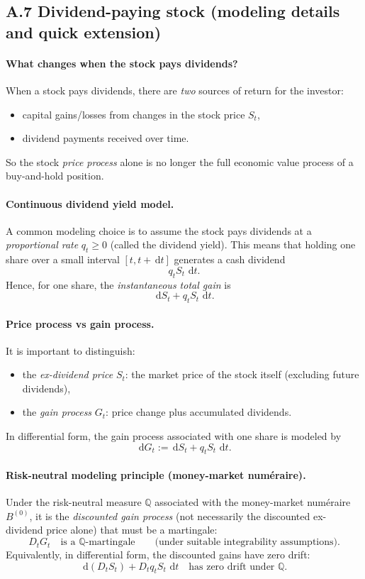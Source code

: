 \documentclass[11pt]{article}
\newcommand{\Qbb}{\mathbb{Q}}
\newcommand{\dd}{\,\mathrm{d}}
\newcommand{\1}{\mathbf{1}}
\begin{document}
\subsection*{A.7 Dividend-paying stock (modeling details and quick extension)}

\paragraph{What changes when the stock pays dividends?}
When a stock pays dividends, there are \emph{two} sources of return for the investor:
\begin{itemize}[leftmargin=1.4em]
    \item capital gains/losses from changes in the stock price \(S_t\),
    \item dividend payments received over time.
\end{itemize}
So the stock \emph{price process} alone is no longer the full economic value process of a buy-and-hold position.

\paragraph{Continuous dividend yield model.}
A common modeling choice is to assume the stock pays dividends at a \emph{proportional rate} \(q_t\ge 0\) (called the dividend yield).
This means that holding one share over a small interval \([t,t+\dd t]\) generates a cash dividend
$$
q_t S_t\,\dd t.
$$
Hence, for one share, the \emph{instantaneous total gain} is
$$
\dd S_t + q_t S_t\,\dd t.
$$

\paragraph{Price process vs gain process.}
It is important to distinguish:
\begin{itemize}[leftmargin=1.4em]
    \item the \emph{ex-dividend price} \(S_t\): the market price of the stock itself (excluding future dividends),
    \item the \emph{gain process} \(G_t\): price change plus accumulated dividends.
\end{itemize}
In differential form, the gain process associated with one share is modeled by
$$
\dd G_t := \dd S_t + q_t S_t\,\dd t.
$$

\paragraph{Risk-neutral modeling principle (money-market num\'eraire).}
Under the risk-neutral measure \(\Qbb\) associated with the money-market num\'eraire \(B^{(0)}\),
it is the \emph{discounted gain process} (not necessarily the discounted ex-dividend price alone) that must be a martingale:
$$
D_t G_t \quad \text{is a } \Qbb\text{-martingale}
\qquad\text{(under suitable integrability assumptions).}
$$
Equivalently, in differential form, the discounted gains have zero drift:
$$
\dd(D_t S_t) + D_t q_t S_t\,\dd t
\quad\text{has zero drift under }\Qbb.
$$
\end{document}
